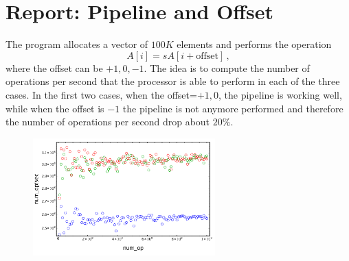 \documentclass[a4paper,9pt, english]{report}
\theoremstyle{plain}
\theoremstyle{definition}
\theoremstyle{remark}
\begin{document}
\section{Report: Pipeline and Offset}

The program allocates a vector of $100K$ elements and performs the operation
\begin{equation}
A[i] = s A[i + \mbox{offset}]\,,
\end{equation}
where the offset can be $+1,0,-1$. 
The idea is to compute the number of operations per second that the processor is able to perform in each of the three cases. 
In the first two cases, when the offset=$+1,0$, the pipeline is working well, while when the offset is $-1$ the 
pipeline is not anymore performed and therefore the number of operations per second drop about $20\%$.

 \begin{figure}
\begin{center}
\includegraphics[width=7cm]{pipeline.pdf}
\end{center}
\caption{}
\label{fig: speedup}
\end{figure}
\end{document}
